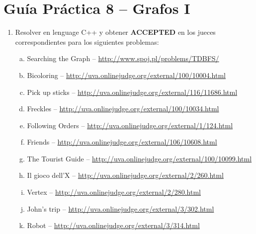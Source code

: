 




\section*{Gu\'ia Pr\'actica 8 -- Grafos I}

\begin{enumerate}[1 -]
	
	\item Resolver en lenguage C++ y obtener \textbf{ACCEPTED} en los jueces correspondientes para los siguientes problemas:
	
	\begin{enumerate}[a)]	
		\item  Searching the Graph -- \href{http://www.spoj.pl/problems/TDBFS/}{http://www.spoj.pl/problems/TDBFS/}
		\item  Bicoloring -- \href{http://uva.onlinejudge.org/external/100/10004.html}{http://uva.onlinejudge.org/external/100/10004.html}
		\item  Pick up sticks -- \href{http://uva.onlinejudge.org/external/116/11686.html}{http://uva.onlinejudge.org/external/116/11686.html}
		\item Freckles -- \href{http://uva.onlinejudge.org/external/100/10034.html}{http://uva.onlinejudge.org/external/100/10034.html}
		\item  Following Orders -- \href{http://uva.onlinejudge.org/external/1/124.html}{http://uva.onlinejudge.org/external/1/124.html}
		\item Friends -- \href{http://uva.onlinejudge.org/external/106/10608.html}{http://uva.onlinejudge.org/external/106/10608.html}
		\item  The Tourist Guide -- \href{http://uva.onlinejudge.org/external/100/10099.html}{http://uva.onlinejudge.org/external/100/10099.html}
		\item Il gioco dell’X -- \href{http://uva.onlinejudge.org/external/2/260.html}{http://uva.onlinejudge.org/external/2/260.html}
		\item Vertex -- \href{http://uva.onlinejudge.org/external/2/280.html}{http://uva.onlinejudge.org/external/2/280.html}
		\item John’s trip -- \href{http://uva.onlinejudge.org/external/3/302.html}{http://uva.onlinejudge.org/external/3/302.html}
		\item Robot -- \href{http://uva.onlinejudge.org/external/3/314.html}{http://uva.onlinejudge.org/external/3/314.html}
	\end{enumerate}
\end{enumerate}

